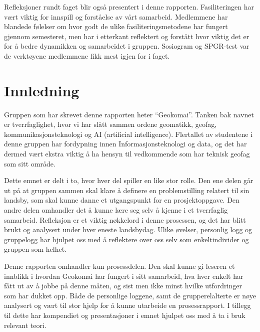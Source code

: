 \documentclass[a4paper,norsk,oneside]{article}
\begin{document}
Refleksjoner rundt faget blir også presentert i denne rapporten. Fasiliteringen har vært viktig for innspill og forståelse av vårt samarbeid. Medlemmene har blandede følelser om hvor godt de ulike fasiliteringsmetodene har fungert gjennom semesteret, men har i etterkant reflektert og forstått hvor viktig det er for å bedre dynamikken og samarbeidet i gruppen. Sosiogram og SPGR-test var de verktøyene medlemmene fikk mest igjen for i faget.

\clearpage
\tableofcontents

\clearpage

\section{Innledning}
Gruppen som har skrevet denne rapporten heter “Geokomai”. Tanken bak navnet er tverrfaglighet, hvor vi har slått sammen ordene geomatikk, geofag,  kommunikasjonsteknologi og AI (artificial intelligence). Flertallet av studentene i denne gruppen har fordypning innen Informasjonsteknologi og data, og det har dermed vært ekstra viktig å ha hensyn til vedkommende som har teknisk geofag som sitt område.

Dette emnet er delt i to, hvor hver del spiller en like stor rolle. Den ene delen går ut på at gruppen sammen skal klare å definere en problemstilling relatert til sin landsby, som skal kunne danne et utgangspunkt for en prosjektoppgave. Den andre delen omhandler det å kunne lære seg selv å kjenne i et tverrfaglig samarbeid. Refleksjon er et viktig nøkkelord i denne prosessen, og det har blitt brukt og analysert under hver eneste landsbydag. Ulike øvelser, personlig logg og gruppelogg har hjulpet oss med å reflektere over oss selv som enkeltindivider og gruppen som helhet. 

Denne rapporten omhandler kun prosessdelen. Den skal kunne gi leseren et innblikk i hvordan Geokomai har fungert i sitt samarbeid, hva hver enkelt har fått ut av å jobbe på denne måten, og sist men ikke minst hvilke utfordringer som har dukket opp. Både de personlige loggene, samt de grupperelalterte er nøye analysert og vært til stor hjelp for å kunne utarbeide en prosessrapport. I tillegg til dette har kompendiet og presentasjoner i emnet hjulpet oss med å ta i bruk relevant teori.

\clearpage
\end{document}
